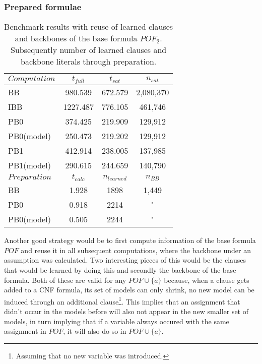 \subsubsection{Prepared formulae}
\begin{wraptable}[20]{R}{8cm}
\begin{tabular}{l | c c c}
$Computation$ & $t_{full}$ & $t_{sat}$ & $n_{sat}$\\
\hline 
BB 			& 980.539 & 672.579 & 2,080,370 \\
IBB 		& 1227.487 & 776.105 &  461,746 \\
PB0 		& 374.425 & 219.909 &  129,912 \\
PB0(model) 	& 250.473 & 219.202 &  129,912 \\
PB1 		& 412.914 & 238.005 &  137,985 \\
PB1(model) 	& 290.615 & 244.659 & 140,790 \\

\hline \hline 
$Preparation$ & $t_{calc}$ & $n_{learned}$ & $n_{BB}$  \\
\hline
BB         & 1.928 & 1898 & 1,449 \\
PB0        & 0.918 & 2214 & " \\
PB0(model) & 0.505 & 2244 & " \\

\end{tabular}
\caption[Performance results with a prepared formula object]{Benchmark results with reuse of learned clauses and backbones of the base formula $POF_2$. Subsequently number of learned clauses and backbone literals through preparation.}
\label{tab:pofPrepBenefit}
\end{wraptable}
Another good strategy would be to first compute information of the base formula $POF$ and reuse it in all subsequent computations, where the backbone under an assumption was calculated. Two interesting pieces of this would be the clauses that would be learned by doing this and secondly the backbone of the base formula. Both of these are valid for any $POF \cup \{a\}$ because, when a clause gets added to a CNF formula, its set of models can only shrink, no new model can be induced through an additional clause\footnote{Assuming that no new variable was introduced.}. This implies that an assignment that didn't occur in the models before will also not appear in the new smaller set of models, in turn implying that if a variable always occured with the same assignment in $POF$, it will also do so in $POF \cup \{a\}$.


